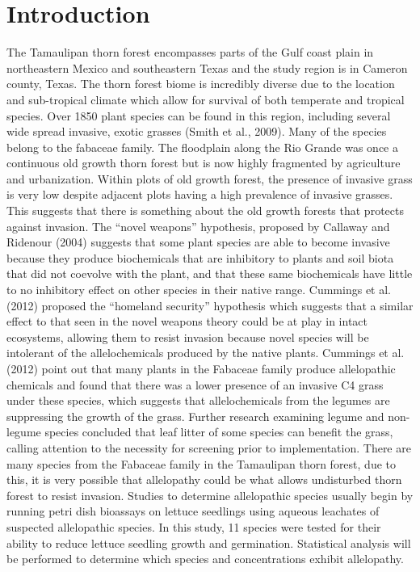 \documentclass{article}
\begin{document}
\section{Introduction}
 The Tamaulipan thorn forest encompasses parts of the Gulf coast plain in northeastern Mexico and southeastern Texas and the study region is in Cameron county, Texas. The thorn forest biome is incredibly diverse due to the location and sub-tropical climate which allow for survival of both temperate and tropical species. Over 1850 plant species can be found in this region, including several wide spread invasive, exotic grasses (Smith et al., 2009). Many of the species belong to the fabaceae family. \newline 
 The floodplain along the Rio Grande was once a continuous old growth thorn forest but is now highly fragmented by agriculture and urbanization. Within plots of old growth forest, the presence of invasive grass is very low despite adjacent plots having a high prevalence of invasive grasses. This suggests that there is something about the old growth forests that protects against invasion. \newline
 The “novel weapons” hypothesis, proposed by Callaway and Ridenour (2004) suggests that some plant species are able to become invasive because they produce biochemicals that are inhibitory to plants and soil biota that did not coevolve with the plant, and that these same biochemicals have little to no inhibitory effect on other species in their native range. Cummings et al. (2012) proposed the “homeland security” hypothesis which suggests that a similar effect to that seen in the novel weapons theory could be at play in intact ecosystems, allowing them to resist invasion because novel species will be intolerant of the allelochemicals produced by the native plants. Cummings et al. (2012) point out that many plants in the Fabaceae family produce allelopathic chemicals and found that there was a lower presence of an invasive C4 grass under these species, which suggests that allelochemicals from the legumes are suppressing the growth of the grass. \newline
 Further research examining legume and non-legume species concluded that leaf litter of some species can benefit the grass, calling attention to the necessity for screening prior to implementation. There are many species from the Fabaceae family in the Tamaulipan thorn forest, due to this, it is very possible that allelopathy could be what allows undisturbed thorn forest to resist invasion. Studies to determine allelopathic species usually begin by running petri dish bioassays on lettuce seedlings using aqueous leachates of suspected allelopathic species. In this study, 11 species were tested for their ability to reduce lettuce seedling growth and germination. Statistical analysis will be performed to determine which species and concentrations exhibit allelopathy.
\end{document}
